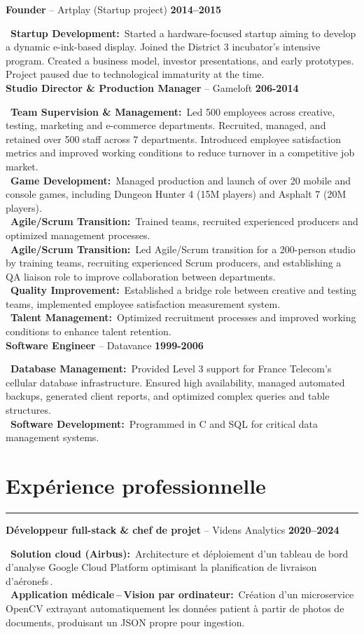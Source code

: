 \documentclass[a4paper,10pt]{article}
\newif\ifpandocconvert
\newcommand{\resumeSection}[2]{%
  \ifpandocconvert %
    \par\addvspace{1em}\noindent\textbf{#1}\par\addvspace{0.5em}%
    #2%
    \par\addvspace{0.3em}%
  \else %
    \section*{#1}%
    \vspace{-2em} %
    \noindent\rule{\textwidth}{0.4pt}%
    \vspace{0.5em} %
    #2%
    \vspace{0.3em}%
  \fi
}
\newcommand{\resumeItem}[3]{%
  \noindent\textbf{#1} -- #2 \hfill \textbf{#3} \\
  \vspace{0.3em}
}
\newcommand{\jobItem}[2]{%
  \noindent
  \textbullet\ \textbf{#1\ifthenelse{\boolean{EN}}{}{ }:}~#2\vspace{0.3em} \\
}
\begin{document}
{{    \vspace{1em}
    \resumeItem{Founder}{Artplay (Startup project)}{2014–2015}
    \jobItem{Startup Development}{Started a hardware-focused startup aiming to develop a dynamic e-ink-based display. Joined the District 3 incubator’s intensive program. Created a business model, investor presentations, and early prototypes. Project paused due to technological immaturity at the time.}
    \vspace{1em}
    \resumeItem{Studio Director \& Production Manager}{Gameloft}{206-2014}
    \jobItem{Team Supervision \& Management}{Led 500 employees across creative, testing, marketing and e-commerce departments. Recruited, managed, and retained over 500 staff across 7 departments. Introduced employee satisfaction metrics and improved working conditions to reduce turnover in a competitive job market.}
    \jobItem{Game Development}{Managed production and launch of over 20 mobile and console games, including Dungeon Hunter 4 (15M players) and Asphalt 7 (20M players).}
    \jobItem{Agile/Scrum Transition}{Trained teams, recruited experienced producers and optimized management processes.}
    \jobItem{Agile/Scrum Transition}{Led Agile/Scrum transition for a 200-person studio by training teams, recruiting experienced Scrum producers, and establishing a QA liaison role to improve collaboration between departments.}
    \jobItem{Quality Improvement}{Established a bridge role between creative and testing teams, implemented employee satisfaction measurement system.}
    \jobItem{Talent Management}{Optimized recruitment processes and improved working conditions to enhance talent retention.}
    \vspace{1em}
    \resumeItem{Software Engineer}{Datavance}{1999-2006}
    \jobItem{Database Management}{Provided Level 3 support for France Telecom's cellular database infrastructure. Ensured high availability, managed automated backups, generated client reports, and optimized complex queries and table structures.}
    \jobItem{Software Development}{Programmed in C and SQL for critical data management systems.}
  }
}{%
  \resumeSection{Expérience professionnelle}{
    \resumeItem{Développeur full-stack \& chef de projet}{Videns Analytics}{2020–2024}
    \jobItem{Solution cloud (Airbus)}{Architecture et déploiement d'un tableau de bord d'analyse Google Cloud Platform optimisant la planification de livraison d'aéronefs .}
    \jobItem{Application médicale – Vision par ordinateur}{Création d'un microservice OpenCV extrayant automatiquement les données patient à partir de photos de documents, produisant un JSON propre pour ingestion.}
}}
\end{document}
